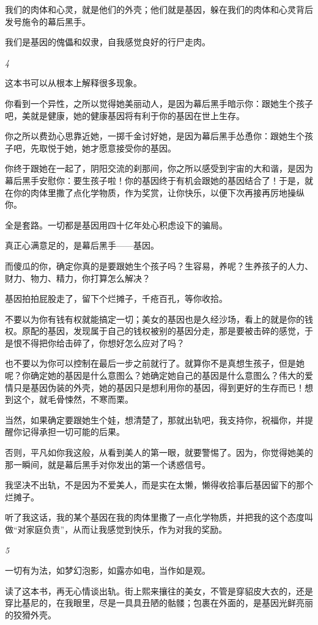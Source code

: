 \documentclass[twoside,openright,headings=optiontohead]{ctexbook} %
\begin{document}
{我们的肉体和心灵，就是他们的外壳；他们就是基因，躲在我们的肉体和心灵背后发号施令的幕后黑手。

我们是基因的傀儡和奴隶，自我感觉良好的行尸走肉。

\emph{4}

这本书可以从根本上解释很多现象。

你看到一个异性，之所以觉得她美丽动人，是因为幕后黑手暗示你：跟她生个孩子吧，美就是健康，她的健康基因将有利于你的基因在世上生存。

你之所以费劲心思靠近她，一掷千金讨好她，是因为幕后黑手怂恿你：跟她生个孩子吧，先取悦于她，她才愿意接受你的基因。

你终于跟她在一起了，阴阳交流的刹那间，你之所以感受到宇宙的大和谐，是因为幕后黑手安慰你：要生孩子啦！你的基因终于有机会跟她的基因结合了！于是，就在你的肉体里撒了点化学物质，作为奖赏，让你快乐，以便下次再接再厉地操纵你。

全是套路。一切都是基因用四十亿年处心积虑设下的骗局。

真正心满意足的，是幕后黑手------基因。

而傻瓜的你，确定你真的是要跟她生个孩子吗？生容易，养呢？生养孩子的人力、财力、物力、精力，你打算怎么解决？

基因拍拍屁股走了，留下个烂摊子，千疮百孔，等你收拾。

不要以为你有钱有权就能搞定一切；美女的基因也是久经沙场，看上的就是你的钱权。原配的基因，发现属于自己的钱权被别的基因分走，那是要被击碎的感觉，于是恨不得把你给击碎了，你想好怎么应对了吗？

也不要以为你可以控制在最后一步之前就行了。就算你不是真想生孩子，但是她呢？你确定她的基因是什么意图么？她确定她自己的基因是什么意图么？伟大的爱情只是基因伪装的外壳，她的基因只是想利用你的基因，得到更好的生存而已！想到这个，就毛骨悚然，不寒而栗。

当然，如果确定要跟她生个娃，想清楚了，那就出轨吧，我支持你，祝福你，并提醒你记得承担一切可能的后果。

否则，平凡如你我这般，从看到美人的第一眼，就要警惕了。因为，你觉得她美的那一瞬间，就是幕后黑手对你发出的第一个诱惑信号。

我坚决不出轨，不是因为不爱美人，而是实在太懒，懒得收拾事后基因留下的那个烂摊子。

听了我这话，我的某个基因在我的肉体里撒了一点化学物质，并把我的这个态度叫做``对家庭负责''，从而让我感觉到快乐，作为对我的奖励。

\emph{5}

一切有为法，如梦幻泡影，如露亦如电，当作如是观。

读了这本书，再无心情谈出轨。街上熙来攘往的美女，不管是穿貂皮大衣的，还是穿比基尼的，在我眼里，尽是一具具丑陋的骷髅；包裹在外面的，是基因光鲜亮丽的狡猾外壳。

}
\end{document}
